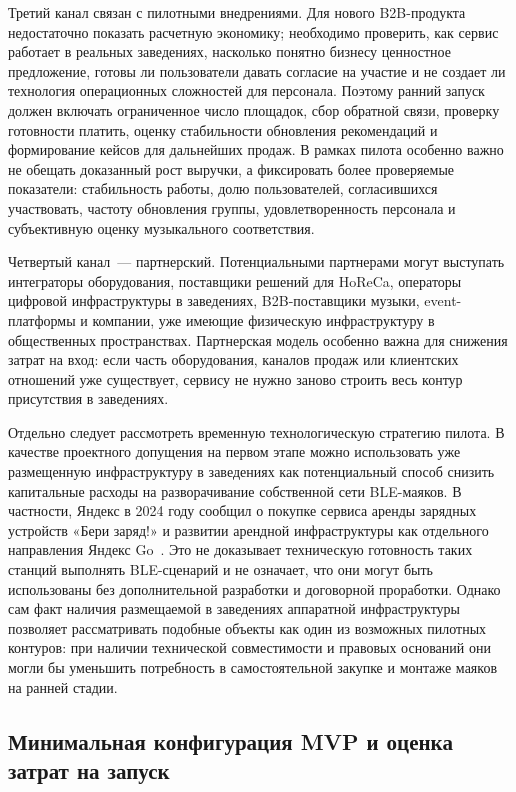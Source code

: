 Третий канал связан с пилотными внедрениями. Для нового B2B-продукта недостаточно показать расчетную экономику; необходимо проверить, как сервис работает в реальных заведениях, насколько понятно бизнесу ценностное предложение, готовы ли пользователи давать согласие на участие и не создает ли технология операционных сложностей для персонала. Поэтому ранний запуск должен включать ограниченное число площадок, сбор обратной связи, проверку готовности платить, оценку стабильности обновления рекомендаций и формирование кейсов для дальнейших продаж. В рамках пилота особенно важно не обещать доказанный рост выручки, а фиксировать более проверяемые показатели: стабильность работы, долю пользователей, согласившихся участвовать, частоту обновления группы, удовлетворенность персонала и субъективную оценку музыкального соответствия.

Четвертый канал~--- партнерский. Потенциальными партнерами могут выступать интеграторы оборудования, поставщики решений для HoReCa, операторы цифровой инфраструктуры в заведениях, B2B-поставщики музыки, event-платформы и компании, уже имеющие физическую инфраструктуру в общественных пространствах. Партнерская модель особенно важна для снижения затрат на вход: если часть оборудования, каналов продаж или клиентских отношений уже существует, сервису не нужно заново строить весь контур присутствия в заведениях.

Отдельно следует рассмотреть временную технологическую стратегию пилота. В качестве проектного допущения на первом этапе можно использовать уже размещенную инфраструктуру в заведениях как потенциальный способ снизить капитальные расходы на разворачивание собственной сети BLE-маяков. В частности, Яндекс в 2024 году сообщил о покупке сервиса аренды зарядных устройств «Бери заряд!» и развитии арендной инфраструктуры как отдельного направления Яндекс Go~\cite{yandex_beri_zaryad_2024}. Это не доказывает техническую готовность таких станций выполнять BLE-сценарий и не означает, что они могут быть использованы без дополнительной разработки и договорной проработки. Однако сам факт наличия размещаемой в заведениях аппаратной инфраструктуры позволяет рассматривать подобные объекты как один из возможных пилотных контуров: при наличии технической совместимости и правовых оснований они могли бы уменьшить потребность в самостоятельной закупке и монтаже маяков на ранней стадии.

\subsection{Минимальная конфигурация MVP и оценка затрат на запуск}
\label{subsec:service:monetization:mvp}

